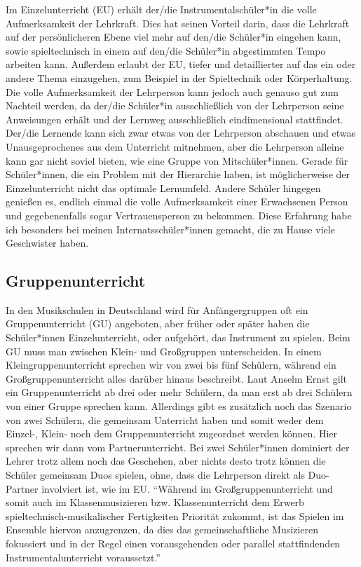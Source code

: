 Im Einzelunterricht (EU) erhält der/die Instrumentalschüler*in die volle
Aufmerksamkeit der Lehrkraft. Dies hat seinen Vorteil darin, dass die Lehrkraft
auf der persönlicheren Ebene viel mehr auf den/die Schüler*in eingehen kann,
sowie spieltechnisch in einem auf den/die Schüler*in abgestimmten Tempo arbeiten
kann. Außerdem erlaubt der EU, tiefer und detaillierter auf das ein oder andere
Thema einzugehen, zum Beispiel in der Spieltechnik oder Körperhaltung. Die volle
Aufmerksamkeit der Lehrperson kann jedoch auch genauso gut zum Nachteil werden,
da der/die Schüler*in ausschließlich von der Lehrperson seine Anweisungen erhält
und der Lernweg ausschließlich eindimensional stattfindet. Der/die Lernende kann
sich zwar etwas von der Lehrperson abschauen und etwas Unausgeprochenes aus dem
Unterricht mitnehmen, aber die Lehrperson alleine kann gar nicht soviel bieten,
wie eine Gruppe von Mitschüler*innen. Gerade für Schüler*innen, die ein Problem
mit der Hierarchie haben, ist möglicherweise der Einzelunterricht nicht das
optimale Lernumfeld. Andere Schüler hingegen genießen es, endlich einmal die
volle Aufmerksamkeit einer Erwachsenen Person und gegebenenfalls sogar
Vertrauensperson zu bekommen. Diese Erfahrung habe ich besonders bei meinen
Internatsschüler*innen gemacht, die zu Hause viele Geschwister haben. 

\subsection{Gruppenunterricht} 
In den Musikschulen in Deutschland wird für Anfängergruppen oft ein
Gruppenunterricht (GU) angeboten, aber früher oder später haben die
Schüler*innen Einzelunterricht, oder aufgehört, das Instrument zu spielen. Beim
GU muss man zwischen Klein- und Großgruppen unterscheiden. In einem
Kleingruppenunterricht sprechen wir von zwei bis fünf Schülern, während ein
Großgruppenunterricht alles darüber hinaus beschreibt.
\autocite[219]{busch:grundwissen_instrumentalpaedagogik} Laut Anselm Ernst gilt
ein Gruppenunterricht ab drei oder mehr Schülern, da man erst ab drei Schülern
von einer Gruppe sprechen kann.
\autocite[79]{ernst:die_zukunftsfaehige_musikschule}
Allerdings gibt es zusätzlich noch das Szenario von zwei Schülern, die gemeinsam
Unterricht haben und somit weder dem Einzel-, Klein- noch dem Gruppenunterricht
zugeordnet werden können. Hier sprechen wir dann vom
Partnerunterricht.\autocite[219]{busch:grundwissen_instrumentalpaedagogik} Bei
zwei Schüler*innen dominiert der Lehrer trotz allem noch das Geschehen, aber
nichts desto trotz können die Schüler gemeinsam Duos spielen, ohne, dass die
Lehrperson direkt als Duo-Partner involviert ist, wie im EU. \enquote{Während im
Großgruppenunterricht und somit auch im Klassenmusizieren bzw. Klassenunterricht
dem Erwerb spieltechnisch-musikalischer Fertigkeiten Priorität zukommt, ist das
Spielen im Ensemble hiervon anzugrenzen, da dies das gemeinschaftliche
Musizieren fokussiert und in der Regel einen vorausgehenden oder parallel
stattfindenden Instrumentalunterricht
voraussetzt.}\autocite[219]{busch:grundwissen_instrumentalpaedagogik}

